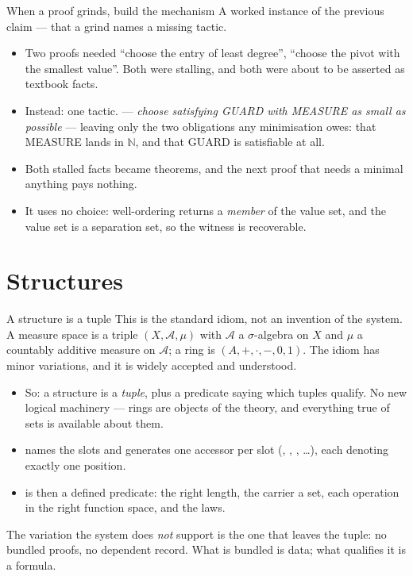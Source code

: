 \documentclass[11pt,aspectratio=169]{beamer}
\begin{document}
\begin{frame}{When a proof grinds, build the mechanism}
  A worked instance of the previous claim --- that a grind names a missing
  tactic.
  \begin{itemize}
    \item Two proofs needed ``choose the entry of least degree'', ``choose the
          pivot with the smallest value''. Both were stalling, and both were
          about to be asserted as textbook facts.
    \item Instead: one tactic.  ---
          \emph{choose  satisfying GUARD with MEASURE as small as
          possible} --- leaving only the two obligations any minimisation owes:
          that MEASURE lands in $\mathbb{N}$, and that GUARD is satisfiable at
          all.
    \item Both stalled facts became theorems, and the next proof that needs a
          minimal anything pays nothing.
    \item It uses no choice: well-ordering returns a \emph{member} of the value
          set, and the value set is a separation set, so the witness is
          recoverable.
  \end{itemize}
\end{frame}

\section{Structures}

\begin{frame}{A structure is a tuple}
  This is the standard idiom, not an invention of the system. A measure space
  is a triple $(X, \mathcal{A}, \mu)$ with $\mathcal{A}$ a $\sigma$-algebra on
  $X$ and $\mu$ a countably additive measure on $\mathcal{A}$; a ring is
  $(A, +, \cdot, -, 0, 1)$. The idiom has minor variations, and it is widely
  accepted and understood.
  \begin{itemize}
    \item So: a structure is a \emph{tuple}, plus a predicate saying which
          tuples qualify. No new logical machinery --- rings are objects of the
          theory, and everything true of sets is available about them.
    \item {} names the slots and generates one accessor
          per slot (, , , \dots), each denoting
          exactly one position.
    \item {} is then a defined predicate: the right length, the
          carrier a set, each operation in the right function space, and the
          laws.
  \end{itemize}
  \vfill
  \small The variation the system does \emph{not} support is the one that
  leaves the tuple: no bundled proofs, no dependent record. What is bundled is
  data; what qualifies it is a formula.
\end{frame}
\end{document}
